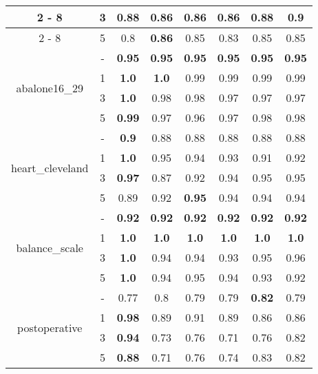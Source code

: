 \documentclass{article}%
\begin{document}
\begin{longtable}{c|c|cccccc}
\cline{2%
-%
8}%
&3&0.88&0.86&0.86&0.86&0.88&\textbf{0.9}\\%
\cline{2%
-%
8}%
&5&0.8&\textbf{0.86}&0.85&0.83&0.85&0.85\\%
\hline%
\multirow{4}{*}{abalone16\_29}&{-}&\textbf{0.95}&\textbf{0.95}&\textbf{0.95}&\textbf{0.95}&\textbf{0.95}&\textbf{0.95}\\%
\cline{2%
-%
8}%
&1&\textbf{1.0}&\textbf{1.0}&0.99&0.99&0.99&0.99\\%
\cline{2%
-%
8}%
&3&\textbf{1.0}&0.98&0.98&0.97&0.97&0.97\\%
\cline{2%
-%
8}%
&5&\textbf{0.99}&0.97&0.96&0.97&0.98&0.98\\%
\hline%
\multirow{4}{*}{heart\_cleveland}&{-}&\textbf{0.9}&0.88&0.88&0.88&0.88&0.88\\%
\cline{2%
-%
8}%
&1&\textbf{1.0}&0.95&0.94&0.93&0.91&0.92\\%
\cline{2%
-%
8}%
&3&\textbf{0.97}&0.87&0.92&0.94&0.95&0.95\\%
\cline{2%
-%
8}%
&5&0.89&0.92&\textbf{0.95}&0.94&0.94&0.94\\%
\hline%
\multirow{4}{*}{balance\_scale}&{-}&\textbf{0.92}&\textbf{0.92}&\textbf{0.92}&\textbf{0.92}&\textbf{0.92}&\textbf{0.92}\\%
\cline{2%
-%
8}%
&1&\textbf{1.0}&\textbf{1.0}&\textbf{1.0}&\textbf{1.0}&\textbf{1.0}&\textbf{1.0}\\%
\cline{2%
-%
8}%
&3&\textbf{1.0}&0.94&0.94&0.93&0.95&0.96\\%
\cline{2%
-%
8}%
&5&\textbf{1.0}&0.94&0.95&0.94&0.93&0.92\\%
\hline%
\multirow{4}{*}{postoperative}&{-}&0.77&0.8&0.79&0.79&\textbf{0.82}&0.79\\%
\cline{2%
-%
8}%
&1&\textbf{0.98}&0.89&0.91&0.89&0.86&0.86\\%
\cline{2%
-%
8}%
&3&\textbf{0.94}&0.73&0.76&0.71&0.76&0.82\\%
\cline{2%
-%
8}%
&5&\textbf{0.88}&0.71&0.76&0.74&0.83&0.82\\%
\hline%
\end{longtable}

%
\end{document}
